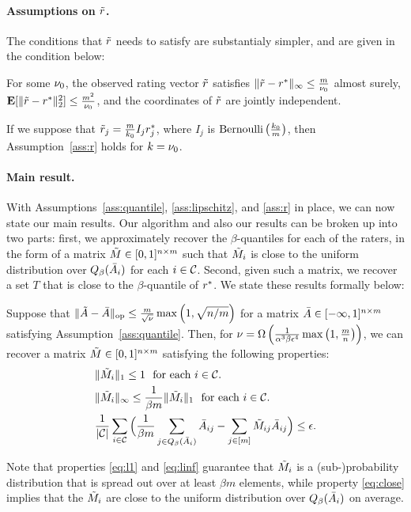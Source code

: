 \paragraph{Assumptions on $\tilde{r}$.}
The conditions that $\tilde{r}$ needs to satisfy are substantialy simpler, and 
are given in the condition below:
\begin{assumption}
\label{ass:r}
For some $\nu_0$, the observed rating vector $\tilde{r}$ satisfies 
$\|\tilde{r} - r^*\|_{\infty} \leq \frac{m}{\nu_0}$ almost surely, 
$\mathbf{E}[\|\tilde{r}-r^*\|_2^2] \leq \frac{m^2}{\nu_0}$, 
and the coordinates of $\tilde{r}$ are jointly independent.
\end{assumption}
If we suppose that 
$\tilde{r}_j = \frac{m}{k_0}I_jr^*_j$, where $I_j$ is $\operatorname{Bernoulli}\left( \frac{k_0}{m} \right)$, then Assumption~\ref{ass:r} holds for $k = \nu_0$.

\paragraph{Main result.}
With Assumptions~\ref{ass:quantile}, \ref{ass:lipschitz}, and \ref{ass:r} 
in place, we can now state our main results. Our algorithm and also our results 
can be broken up into two parts: first, we approximately recover the 
$\beta$-quantiles for each of the raters, in the form of a matrix 
$\tilde{M} \in [0,1]^{n \times m}$ such that $\tilde{M}_i$ is close to the uniform distribution 
over $Q_{\beta}(\bar{A}_i)$ for each $i \in \mathcal{C}$. Second, given such a matrix, 
we recover a set $T$ that is close to the $\beta$-quantile of $r^*$. 
We state these results formally below:
\begin{theorem}
\label{thm:main-M}
Suppose that 
$\|\tilde{A} - \bar{A}\|_{\mathrm{op}} \leq \frac{m}{\sqrt{\nu}}\max\left( 1, \sqrt{n/m} \right)$ for a 
matrix $\bar{A} \in [-\infty,1]^{n \times m}$ satisfying 
Assumption~\ref{ass:quantile}. Then, for 
$\nu = \Omega\left( \frac{1}{\alpha^3\beta\epsilon^4}\max\left( 1,\frac{m}{n} \right) \right)$, we can 
recover a matrix $\tilde{M} \in [0,1]^{n \times m}$ satisfying the following 
properties:
\begin{align}
\label{eq:l1} &\|\tilde{M}_i\|_1 \leq 1 \text{ \ for each $i \in \mathcal{C}$.} \\
\label{eq:linf} &\|\tilde{M}_i\|_{\infty} \leq \frac{1}{\beta m}\|\tilde{M}_i\|_1 \text{ \ for each $i \in \mathcal{C}$.} \\
\label{eq:close} &\frac{1}{|\mathcal{C}|}\sum_{i \in \mathcal{C}}\Big(\frac{1}{\beta m}\sum_{j \in Q_{\beta}(\bar{A}_i)} \bar{A}_{ij} - \sum_{j \in [m]} \tilde{M}_{ij}\bar{A}_{ij}\Big) \leq \epsilon.
\end{align}
\end{theorem}
Note that properties \eqref{eq:l1} and \eqref{eq:linf} guarantee that $\tilde{M}_i$ is a 
(sub-)probability distribution that is spread out over at least $\beta m$ 
elements, while property \eqref{eq:close} implies that the $\tilde{M}_i$ are close to 
the uniform distribution over $Q_{\beta}(\bar{A}_i)$ on average.

